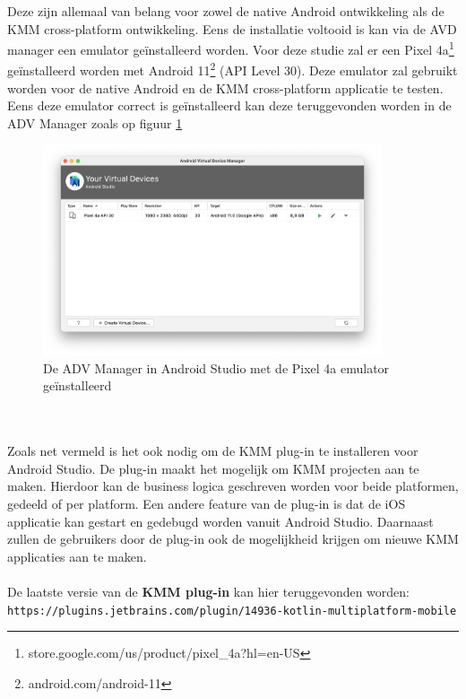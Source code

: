     Deze zijn allemaal van belang voor zowel de native Android ontwikkeling als de KMM cross-platform ontwikkeling. Eens de installatie voltooid is kan via de AVD manager een emulator geïnstalleerd worden. Voor deze studie zal er een Pixel 4a\footnote{store.google.com/us/product/pixel\_4a?hl=en-US} geïnstalleerd worden met Android 11\footnote{android.com/android-11} (API Level 30). Deze emulator zal gebruikt worden voor de native Android en de KMM cross-platform applicatie te testen. Eens deze emulator correct is geïnstalleerd kan deze teruggevonden worden in de ADV Manager zoals op figuur \ref{fig:M-as-adv-manager}
    \begin{figure}
        \centering
        \includegraphics[width=10cm]{img/as-adv-manager.png}
        \caption{De ADV Manager in Android Studio met de Pixel 4a emulator geïnstalleerd}
        \label{fig:M-as-adv-manager}
    \end{figure}
    \\ \\
    Zoals net vermeld is het ook nodig om de KMM plug-in te installeren voor Android Studio. De plug-in maakt het mogelijk om KMM projecten aan te maken. Hierdoor kan de business logica geschreven worden voor beide platformen, gedeeld of per platform. Een andere feature van de plug-in is dat de iOS applicatie kan gestart en gedebugd worden vanuit Android Studio. Daarnaast zullen de gebruikers door de plug-in ook de mogelijkheid krijgen om nieuwe KMM applicaties aan te maken.
    \\ \\ 
    De laatste versie van de \textbf{KMM plug-in} kan hier teruggevonden worden:\\
    \verb*|https://plugins.jetbrains.com/plugin/14936-kotlin-multiplatform-mobile|
    
